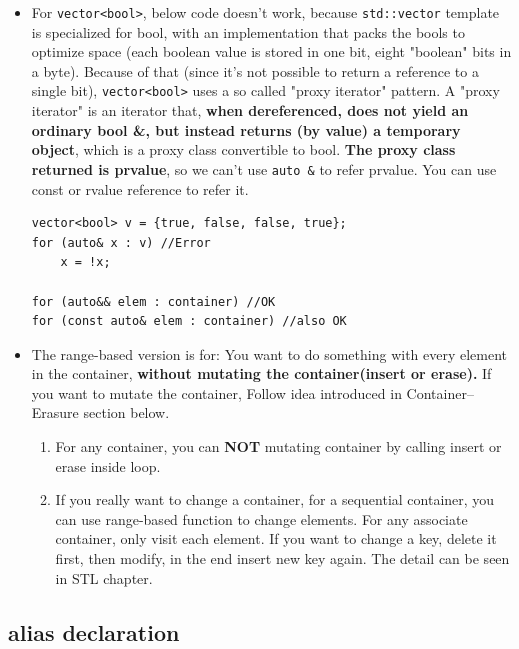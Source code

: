 \documentclass[a4paper,11pt,twoside]{book}
\begin{document}
\begin{itemize}
\begin{enumerate}
	\end{enumerate}
	
	
\item For \texttt{vector<bool>}, below code doesn't work, because \texttt{std::vector} template is specialized for bool, with an implementation that packs the bools to optimize space (each boolean value is stored in one bit, eight "boolean" bits in a byte). Because of that (since it's not possible to return a reference to a single bit), \texttt{vector<bool>} uses a so called "proxy iterator" pattern. A "proxy iterator" is an iterator that, \textbf{when dereferenced, does not yield an ordinary bool \&, but instead returns (by value) a temporary object}, which is a proxy class convertible to bool. \textbf{The proxy class returned is prvalue}, so we can't use \texttt{auto \&} to refer prvalue. You can use const or rvalue reference to refer it.
\begin{lstlisting}[numbers=none]
vector<bool> v = {true, false, false, true};
for (auto& x : v) //Error
    x = !x;

for (auto&& elem : container) //OK
for (const auto& elem : container) //also OK
\end{lstlisting}
	
	
	\item The range-based version is for: You want to do something with every element in the container, \textbf{without mutating the container(insert or erase).} If you want to mutate the container, Follow idea introduced in Container--Erasure section below.
	
	\begin{enumerate}
		\item For any container, you can \textbf{NOT} mutating container by calling insert or erase inside loop.
		
		\item If you really want to change a container, for a sequential container, you can use range-based function to change elements. For any associate container, only visit each element. If you want to change a key, delete it first, then modify, in the end insert new key again. The detail can be seen in STL chapter. 
	\end{enumerate}
	
\end{itemize}

\subsection{alias declaration}
\end{document}
